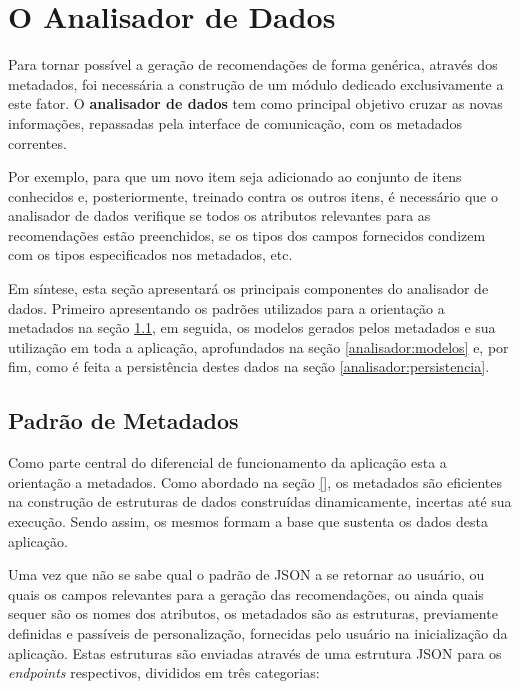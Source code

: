 \documentclass[12pt, openright, oneside, a4paper, brazil]{abntex2}
\begin{document}
\section{O Analisador de Dados} \label{analisador}

Para tornar possível a geração de recomendações de forma genérica, através dos metadados, foi necessária a construção de um módulo dedicado exclusivamente a este fator. O \textbf{analisador de dados} tem como principal objetivo cruzar as novas informações, repassadas pela interface de comunicação, com os metadados correntes.

Por exemplo, para que um novo item seja adicionado ao conjunto de itens conhecidos e, posteriormente, treinado contra os outros itens, é necessário que o analisador de dados verifique se todos os atributos relevantes para as recomendações estão preenchidos, se os tipos dos campos fornecidos condizem com os tipos especificados nos metadados, etc. 

Em síntese, esta seção apresentará os principais componentes do analisador de dados. Primeiro apresentando os padrões utilizados para a orientação a metadados na seção \ref{analisador:padrao_metadados}, em seguida, os modelos gerados pelos metadados e sua utilização em toda a aplicação, aprofundados na seção \ref{analisador:modelos} e, por fim, como é feita a persistência destes dados na seção \ref{analisador:persistencia}.

\subsection{Padrão de Metadados} \label{analisador:padrao_metadados}

Como parte central do diferencial de funcionamento da aplicação esta a orientação a metadados. Como abordado na seção \ref{}, os metadados são eficientes na construção de estruturas de dados construídas dinamicamente, incertas até sua execução. Sendo assim, os mesmos formam a base que sustenta os dados desta aplicação.

Uma vez que não se sabe qual o padrão de JSON a se retornar ao usuário, ou quais os campos relevantes para a geração das recomendações, ou ainda quais sequer são os nomes dos atributos, os metadados são as estruturas, previamente definidas e passíveis de personalização, fornecidas pelo usuário na inicialização da aplicação. Estas estruturas são enviadas através de uma estrutura JSON para os \textit{endpoints} respectivos, divididos em três categorias:
\end{document}

